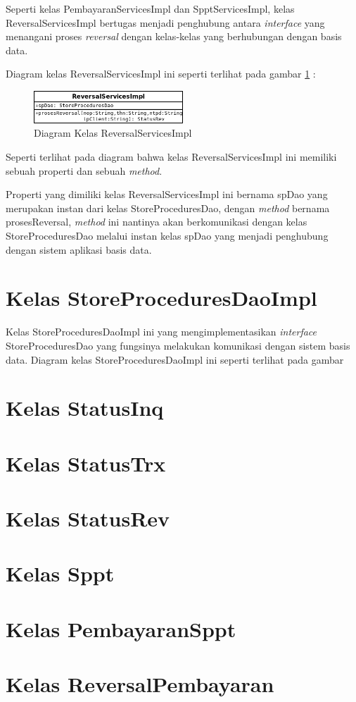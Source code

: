 Seperti kelas PembayaranServicesImpl dan SpptServicesImpl, kelas ReversalServicesImpl bertugas menjadi penghubung antara \textit{interface} yang menangani proses \textit{reversal} dengan kelas-kelas yang berhubungan dengan basis data. 

Diagram kelas ReversalServicesImpl ini seperti terlihat pada gambar \ref{fig:uml-class-ReversalServicesImpl} :

\begin{figure}[H]
  \centering
  \includegraphics[width=0.5\textwidth]{./resources/uml/uml-class-ReversalServicesImpl}
  \caption{Diagram Kelas ReversalServicesImpl}
  \label{fig:uml-class-ReversalServicesImpl}
\end{figure}

Seperti terlihat pada diagram bahwa kelas ReversalServicesImpl ini memiliki sebuah properti dan sebuah \textit{method}.

Properti yang dimiliki kelas ReversalServicesImpl ini bernama spDao yang merupakan instan dari kelas StoreProceduresDao, dengan \textit{method} bernama prosesReversal, \textit{method} ini nantinya akan berkomunikasi dengan kelas StoreProceduresDao melalui instan kelas spDao yang menjadi penghubung dengan sistem aplikasi basis data.

\section{Kelas StoreProceduresDaoImpl}

Kelas StoreProceduresDaoImpl ini yang mengimplementasikan \textit{interface} StoreProceduresDao yang fungsinya melakukan komunikasi dengan sistem basis data. Diagram kelas StoreProceduresDaoImpl ini seperti terlihat pada gambar 

\section{Kelas StatusInq}

\section{Kelas StatusTrx}

\section{Kelas StatusRev}

\section{Kelas Sppt}

\section{Kelas PembayaranSppt}

\section{Kelas ReversalPembayaran}